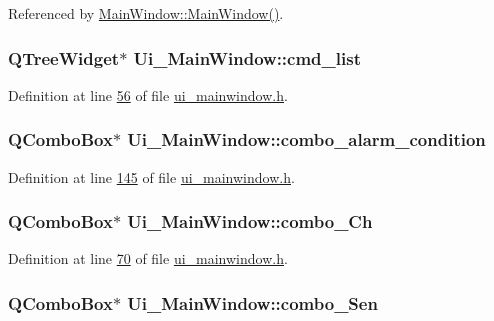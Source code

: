 Referenced by \hyperlink{a00038_source_l00024}{Main\+Window\+::\+Main\+Window()}.

\hypertarget{a00027_aa66ece71395b435e915d384fb63bac1d}{
\subsubsection[{cmd\+\_\+list}]{\setlength{\rightskip}{0pt plus 5cm}Q\+Tree\+Widget$\ast$ Ui\+\_\+\+Main\+Window\+::cmd\+\_\+list}}\label{a00027_aa66ece71395b435e915d384fb63bac1d}


Definition at line \hyperlink{a00052_source_l00056}{56} of file \hyperlink{a00052_source}{ui\+\_\+mainwindow.\+h}.

\hypertarget{a00027_a2af463e4a88fddd219f2e41a386fbd68}{
\subsubsection[{combo\+\_\+alarm\+\_\+condition}]{\setlength{\rightskip}{0pt plus 5cm}Q\+Combo\+Box$\ast$ Ui\+\_\+\+Main\+Window\+::combo\+\_\+alarm\+\_\+condition}}\label{a00027_a2af463e4a88fddd219f2e41a386fbd68}


Definition at line \hyperlink{a00052_source_l00145}{145} of file \hyperlink{a00052_source}{ui\+\_\+mainwindow.\+h}.

\hypertarget{a00027_a263fb43f2eff37a44ff7359ba41e2eeb}{
\subsubsection[{combo\+\_\+\+Ch}]{\setlength{\rightskip}{0pt plus 5cm}Q\+Combo\+Box$\ast$ Ui\+\_\+\+Main\+Window\+::combo\+\_\+\+Ch}}\label{a00027_a263fb43f2eff37a44ff7359ba41e2eeb}


Definition at line \hyperlink{a00052_source_l00070}{70} of file \hyperlink{a00052_source}{ui\+\_\+mainwindow.\+h}.

\hypertarget{a00027_ad95005b5fcac8126171019298147b285}{
\subsubsection[{combo\+\_\+\+Sen}]{\setlength{\rightskip}{0pt plus 5cm}Q\+Combo\+Box$\ast$ Ui\+\_\+\+Main\+Window\+::combo\+\_\+\+Sen}}\label{a00027_ad95005b5fcac8126171019298147b285}


